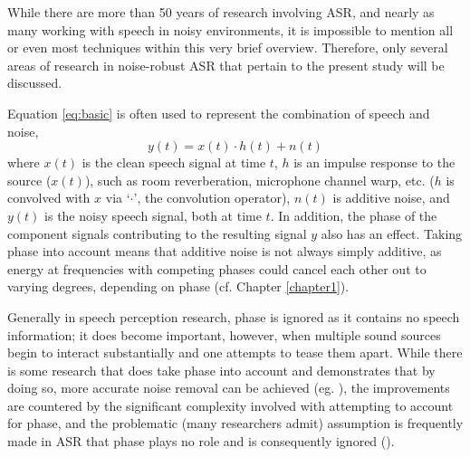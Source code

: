 While there are more than 50 years of research involving ASR, and nearly as many working with speech in noisy environments, it is impossible to mention all or even most techniques within this very brief overview.  Therefore, %
 only several areas of research in noise-robust ASR that pertain to the present study will be discussed.

Equation \ref{eq:basic} is often used to represent the combination of speech and noise,
\begin{equation}\label{eq:basic}
y(t) = x(t) \cdot h(t) + n(t)
\end{equation}
where $x(t)$ is the clean speech signal at time $t$, $h$ is an impulse response to the source ($x(t)$), such as room reverberation, microphone channel warp, etc. ($h$ is convolved with $x$ via `$\cdot$', the convolution operator), $n(t)$ is additive noise, and $y(t)$ is the noisy speech signal, both at time $t$.  In addition, the phase of the component signals contributing to the resulting signal $y$ also has an effect.  Taking phase into account means that additive noise is not always simply additive, as energy at frequencies with competing phases could cancel each other out to varying degrees, depending on phase (cf. Chapter \ref{chapter1}).  

Generally in speech perception research, phase is ignored as it contains no speech information; it does become important, however, when multiple sound sources begin to interact substantially and one attempts to tease them apart.  While there is some research that does take phase into account and demonstrates that by doing so, more accurate noise removal can be achieved (eg. \cite{deng:04,leutnant:09}), the improvements are countered by the significant complexity involved with attempting to account for phase, and the problematic (many researchers admit) assumption is frequently made in ASR that phase plays no role and is consequently ignored (\cite{li:14}).  

